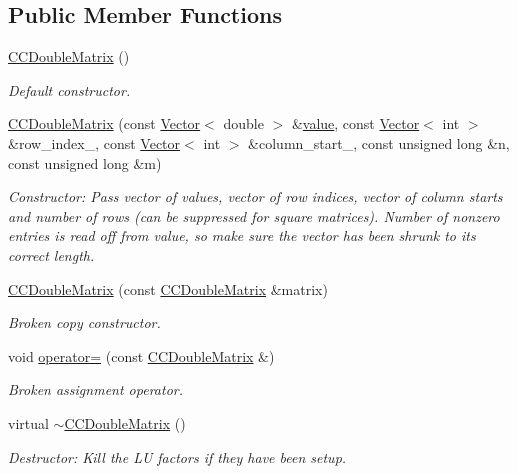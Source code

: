\subsection*{Public Member Functions}
\begin{DoxyCompactItemize}
\item 
\hyperlink{classoomph_1_1CCDoubleMatrix_abc80ef8ffa3a961daf6759bb2c574239}{C\+C\+Double\+Matrix} ()
\begin{DoxyCompactList}\small\item\em Default constructor. \end{DoxyCompactList}\item 
\hyperlink{classoomph_1_1CCDoubleMatrix_ad98b162e3cc1aac48e9f5e1e06e262a5}{C\+C\+Double\+Matrix} (const \hyperlink{classoomph_1_1Vector}{Vector}$<$ double $>$ \&\hyperlink{classoomph_1_1SparseMatrix_a3e382ff145082821a6b0b3e63b6aed5d}{value}, const \hyperlink{classoomph_1_1Vector}{Vector}$<$ int $>$ \&row\+\_\+index\+\_\+, const \hyperlink{classoomph_1_1Vector}{Vector}$<$ int $>$ \&column\+\_\+start\+\_\+, const unsigned long \&n, const unsigned long \&m)
\begin{DoxyCompactList}\small\item\em Constructor\+: Pass vector of values, vector of row indices, vector of column starts and number of rows (can be suppressed for square matrices). Number of nonzero entries is read off from value, so make sure the vector has been shrunk to its correct length. \end{DoxyCompactList}\item 
\hyperlink{classoomph_1_1CCDoubleMatrix_a98d894f76da33c507c6d7368b13a4fb6}{C\+C\+Double\+Matrix} (const \hyperlink{classoomph_1_1CCDoubleMatrix}{C\+C\+Double\+Matrix} \&matrix)
\begin{DoxyCompactList}\small\item\em Broken copy constructor. \end{DoxyCompactList}\item 
void \hyperlink{classoomph_1_1CCDoubleMatrix_ad21e909c73b8336792afd20de783e7c7}{operator=} (const \hyperlink{classoomph_1_1CCDoubleMatrix}{C\+C\+Double\+Matrix} \&)
\begin{DoxyCompactList}\small\item\em Broken assignment operator. \end{DoxyCompactList}\item 
virtual \hyperlink{classoomph_1_1CCDoubleMatrix_a89019bdd7b9a64a2f32cd4efa07fe45c}{$\sim$\+C\+C\+Double\+Matrix} ()
\begin{DoxyCompactList}\small\item\em Destructor\+: Kill the LU factors if they have been setup. \end{DoxyCompactList}\item 

\end{DoxyCompactItemize}
